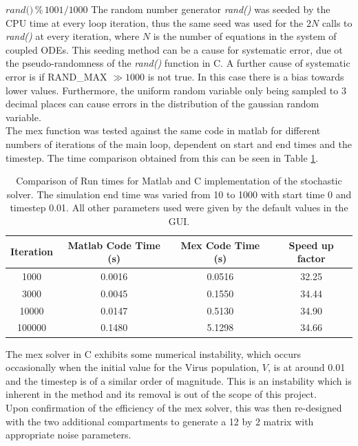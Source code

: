\documentclass[a4paper, 12pt]{report}
\begin{document}
$\textit{rand()}\,\%\, 1001 / 1000$ 
The random number generator \textit{rand()} was seeded by the CPU time at every loop iteration, thus the same seed was used for the $2N$ calls to \textit{rand()} at every iteration, where $N$ is the number of equations in the system of coupled ODEs. This seeding method can be a cause for systematic error, due ot the pseudo-randomness of the \textit{rand()} function in C. A further cause of systematic error is if RAND\_MAX $\gg 1000$ is not true. In this case there is a bias towards lower values. Furthermore, the uniform random variable only being sampled to 3 decimal places can cause errors in the distribution of the gaussian random variable.\\

The mex function was tested against the same code in matlab for different numbers of iterations of the main loop, dependent on start and end times and the timestep. The time comparison obtained from this can be seen in Table \ref{tbl:matlabCComparison}.

\begin{table}
\centering
\begin{tabular}{ | c | c | c | c | }
\hline
Iteration & Matlab Code Time (s) & Mex Code Time (s) & Speed up factor \\ \hline
1000 & 0.0016 & 0.0516 & 32.25 \\ \hline
3000 & 0.0045 & 0.1550 & 34.44 \\ \hline
10000 & 0.0147 & 0.5130 & 34.90 \\ \hline
100000 & 0.1480 & 5.1298 & 34.66 \\
\hline
\end{tabular}
\caption{Comparison of Run times for Matlab and C implementation of the stochastic solver. The simulation end time was varied from 10 to 1000 with start time 0 and timestep 0.01. All other parameters used were given by the default values in the GUI.}
\label{tbl:matlabCComparison}
\end{table}

The mex solver in C exhibits some numerical instability, which occurs occasionally when the initial value for the Virus population, $V$, is at around 0.01 and the timestep is of a similar order of magnitude. This is an instability which is inherent in the method and its removal is out of the scope of this project. \\

Upon confirmation of the efficiency of the mex solver, this was then re-designed with the two additional compartments to generate a 12 by 2 matrix with appropriate noise parameters.
\end{document}
